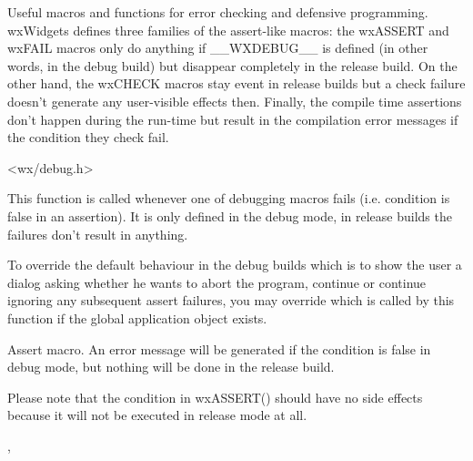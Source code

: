 Useful macros and functions for error checking and defensive programming.
wxWidgets defines three families of the assert-like macros:
the wxASSERT and wxFAIL macros only do anything if \_\_WXDEBUG\_\_ is defined
(in other words, in the debug build) but disappear completely in the release
build. On the other hand, the wxCHECK macros stay event in release builds but a
check failure doesn't generate any user-visible effects then. Finally, the
compile time assertions don't happen during the run-time but result in the
compilation error messages if the condition they check fail.


<wx/debug.h>


\label{wxonassert}


This function is called whenever one of debugging macros fails (i.e. condition
is false in an assertion). It is only defined in the debug mode, in release
builds the  failures don't result in anything.

To override the default behaviour in the debug builds which is to show the user
a dialog asking whether he wants to abort the program, continue or continue
ignoring any subsequent assert failures, you may override
 which is called by this function if
the global application object exists.


\label{wxassert}


Assert macro. An error message will be generated if the condition is false in
debug mode, but nothing will be done in the release build.

Please note that the condition in wxASSERT() should have no side effects
because it will not be executed in release mode at all.


,\\


\label{wxassertminbitsize}


